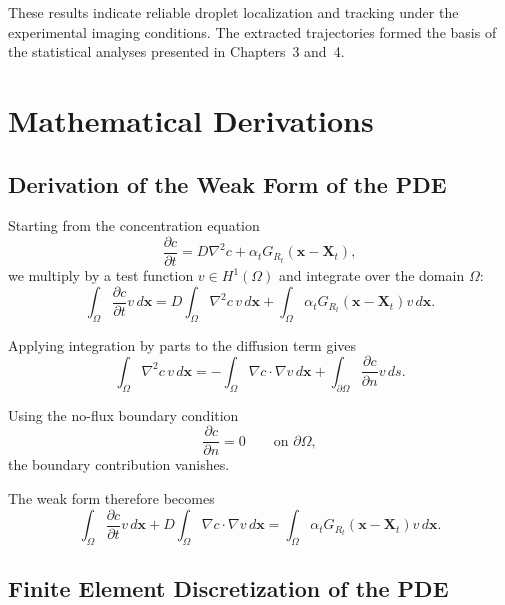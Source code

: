 These results indicate reliable droplet localization and tracking under the experimental imaging conditions. The extracted trajectories formed the basis of the statistical analyses presented in Chapters~3 and~4.
\chapter{Mathematical Derivations}
\label{app:math_derivations}

\section{Derivation of the Weak Form of the PDE}

Starting from the concentration equation
\begin{equation}
\frac{\partial c}{\partial t}
=
D \nabla^2 c
+
\alpha_t G_{R_t}(\mathbf{x}-\mathbf{X}_t),
\end{equation}
we multiply by a test function \(v \in H^1(\Omega)\) and integrate over the domain \(\Omega\):
\begin{equation}
\int_{\Omega}
\frac{\partial c}{\partial t}v\,d\mathbf{x}
=
D\int_{\Omega}
\nabla^2 c\,v\,d\mathbf{x}
+
\int_{\Omega}
\alpha_t
G_{R_t}(\mathbf{x}-\mathbf{X}_t)
v\,d\mathbf{x}.
\end{equation}

Applying integration by parts to the diffusion term gives
\begin{equation}
\int_{\Omega}
\nabla^2 c\,v\,d\mathbf{x}
=
-\int_{\Omega}
\nabla c\cdot\nabla v\,d\mathbf{x}
+
\int_{\partial\Omega}
\frac{\partial c}{\partial n}v\,ds.
\end{equation}

Using the no-flux boundary condition
\begin{equation}
\frac{\partial c}{\partial n}=0
\qquad
\text{on }\partial\Omega,
\end{equation}
the boundary contribution vanishes.

The weak form therefore becomes
\begin{equation}
\int_{\Omega}
\frac{\partial c}{\partial t}v\,d\mathbf{x}
+
D\int_{\Omega}
\nabla c\cdot\nabla v\,d\mathbf{x}
=
\int_{\Omega}
\alpha_t
G_{R_t}(\mathbf{x}-\mathbf{X}_t)
v\,d\mathbf{x}.
\end{equation}

\section{Finite Element Discretization of the PDE}

